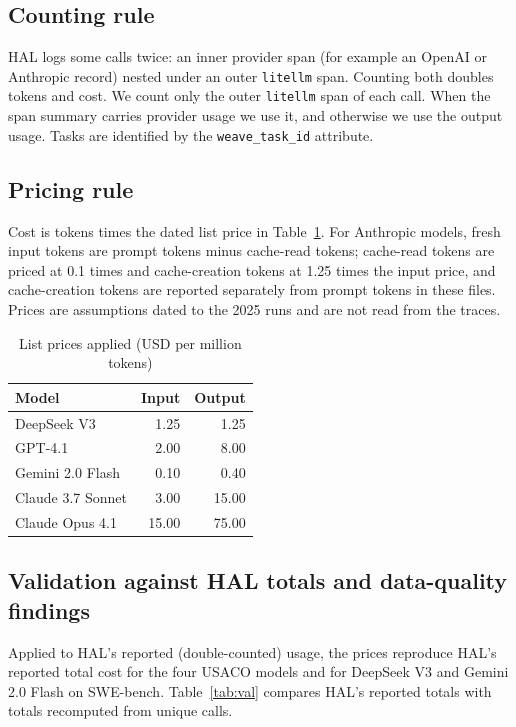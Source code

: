 \documentclass[10pt]{article}
\begin{document}
\subsection{Counting rule}
HAL logs some calls twice: an inner provider span (for example an OpenAI or Anthropic record) nested under an outer \texttt{litellm} span. Counting both doubles tokens and cost. We count only the outer \texttt{litellm} span of each call. When the span summary carries provider usage we use it, and otherwise we use the output usage. Tasks are identified by the \texttt{weave\_task\_id} attribute.

\subsection{Pricing rule}
Cost is tokens times the dated list price in Table~\ref{tab:prices}. For Anthropic models, fresh input tokens are prompt tokens minus cache-read tokens; cache-read tokens are priced at 0.1 times and cache-creation tokens at 1.25 times the input price, and cache-creation tokens are reported separately from prompt tokens in these files. Prices are assumptions dated to the 2025 runs and are not read from the traces.

\begin{table}[h]
\caption{List prices applied (USD per million tokens)}\label{tab:prices}
\centering\small
\begin{tabular}{lrr}
\toprule
Model & Input & Output \\
\midrule
DeepSeek V3 & 1.25 & 1.25 \\
GPT-4.1 & 2.00 & 8.00 \\
Gemini 2.0 Flash & 0.10 & 0.40 \\
Claude 3.7 Sonnet & 3.00 & 15.00 \\
Claude Opus 4.1 & 15.00 & 75.00 \\
\bottomrule
\end{tabular}
\end{table}

\subsection{Validation against HAL totals and data-quality findings}
Applied to HAL's reported (double-counted) usage, the prices reproduce HAL's reported total cost for the four USACO models and for DeepSeek V3 and Gemini 2.0 Flash on SWE-bench. Table~\ref{tab:val} compares HAL's reported totals with totals recomputed from unique calls.
\end{document}
